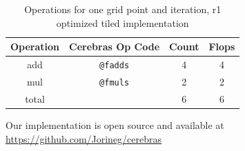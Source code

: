 \begin{table}[h]
    \centering
    \caption{Operations for one grid point and iteration, r1 optimized tiled implementation}
    \label{tab:tiled_operations_r1_optimized}
    \begin{tabular}{@{}cccc@{}}
        \toprule
        Operation & Cerebras Op Code & Count & Flops \\
        \midrule
        add & \texttt{@fadds} & \num{4} & \num{4} \\
        mul & \texttt{@fmuls} & \num{2} & \num{2} \\
        \midrule
        total & & \num{6} & \num{6} \\
        \bottomrule
    \end{tabular}
\end{table}

Our implementation is open source and available at \url{https://github.com/Jorineg/cerebras}
